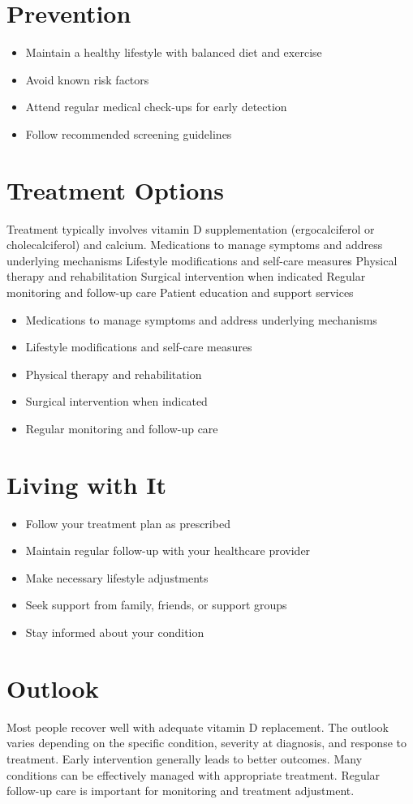 \section{Prevention}
\begin{itemize}[noitemsep]
  \item Maintain a healthy lifestyle with balanced diet and exercise
  \item Avoid known risk factors
  \item Attend regular medical check-ups for early detection
  \item Follow recommended screening guidelines
\end{itemize}
\section{Treatment Options}
Treatment typically involves vitamin D supplementation (ergocalciferol or cholecalciferol) and calcium. Medications to manage symptoms and address underlying mechanisms Lifestyle modifications and self-care measures Physical therapy and rehabilitation Surgical intervention when indicated Regular monitoring and follow-up care Patient education and support services

\begin{itemize}[noitemsep]
  \item Medications to manage symptoms and address underlying mechanisms
  \item Lifestyle modifications and self-care measures
  \item Physical therapy and rehabilitation
  \item Surgical intervention when indicated
  \item Regular monitoring and follow-up care
\end{itemize}
\section{Living with It}
\begin{itemize}[noitemsep]
  \item Follow your treatment plan as prescribed
  \item Maintain regular follow-up with your healthcare provider
  \item Make necessary lifestyle adjustments
  \item Seek support from family, friends, or support groups
  \item Stay informed about your condition
\end{itemize}
\section{Outlook}
Most people recover well with adequate vitamin D replacement. The outlook varies depending on the specific condition, severity at diagnosis, and response to treatment. Early intervention generally leads to better outcomes. Many conditions can be effectively managed with appropriate treatment. Regular follow-up care is important for monitoring and treatment adjustment.
